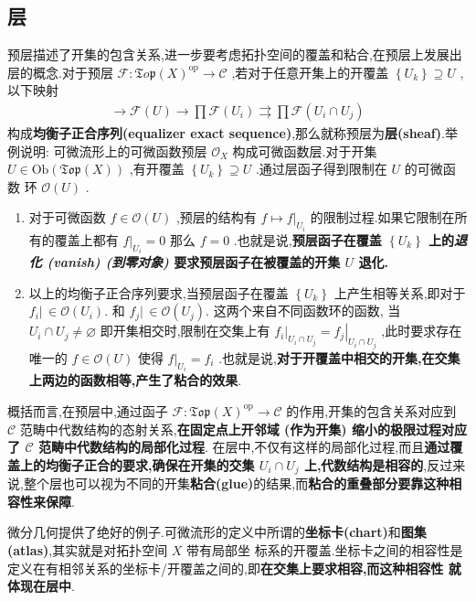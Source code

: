 \subsection{层}
预层描述了开集的包含关系,进一步要考虑拓扑空间的覆盖和粘合,在预层上发展出层的概念.对于预层 $\mathscr{F}: \mathfrak{T} o \mathfrak{p}(X)^{\mathrm{op}} \rightarrow \mathcal{C}$ ,若对于任意开集上的开覆盖 $\left\{U_k\right\} \supseteq U$ ,以下映射
\begin{align*}
\longrightarrow \mathscr{F}(U) \longrightarrow \prod \mathscr{F}\left(U_i\right) \rightrightarrows \prod \mathscr{F}\left(U_i \cap U_j\right)
\end{align*}
构成\textbf{均衡子正合序列(equalizer exact sequence)},那么就称预层为\textbf{层(sheaf)}.举例说明: 可微流形上的可微函数预层 $\mathcal{O}_X$ 构成可微函数层.对于开集 $U \in \mathrm{Ob}(\mathfrak{T o p}(X))$ ,有开覆盖 $\left\{U_k\right\} \supseteq U$ .通过层函子得到限制在 $U$ 的可微函数 环 $\mathcal{O}(U)$ .

\begin{enumerate}
  \item 对于可微函数 $f \in \mathcal{O}(U)$ ,预层的结构有 $\left.f \mapsto f\right|_{U_i}$ 的限制过程.如果它限制在所有的覆盖上都有 $\left.f\right|_{U_i}=0$ 那么 $f=0$ .也就是说,\textbf{预层函子在覆盖 $\left\{U_k\right\}$ 上的\textit{退化 (vanish) (到零对象)} 要求预层函子在被覆盖的开集 $U$ 退化.}

  \item 以上的均衡子正合序列要求,当预层函子在覆盖 $\left\{U_k\right\}$ 上产生相等关系,即对于 $f_i\bigl| \,\in \mathcal{O}\left(U_i\right)\bigr.$ 和 $f_j\bigl|\,\in \mathcal{O}\left(U_j\right)\bigr.$ 这两个来自不同函数环的函数,\textcolor[rgb]{0.66,0.15,0.39}{ 当 $U_i \cap U_j \neq \varnothing$ 即开集相交时,限制在交集上有 $\left.f_i\right|_{U_i \cap U_j}=\left.f_j\right|_{U_i \cap U_j}$ ,此时要求存在唯一的 $f \in \mathcal{O}(U)$ 使得 $\left.f\right|_{U_i}=f_i$ }.也就是说,\textbf{对于开覆盖中相交的开集,在交集上两边的函数相等,产生了粘合的效果}.
\end{enumerate}

\begin{key}
概括而言,在预层中,通过函子 $\mathscr{F}: \mathfrak{T} \mathfrak{o p}(X)^{\mathrm{op}} \rightarrow \mathcal{C}$ 的作用,开集的包含关系对应到 $\mathcal{C}$ 范畴中代数结构的态射关系,\textbf{在固定点上开邻域 (作为开集) 缩小的极限过程对应了 $\mathcal{C}$ 范畴中代数结构的局部化过程}.
在层中,不仅有这样的局部化过程,而且\textbf{通过覆盖上的均衡子正合的要求,确保在开集的交集 $U_i \cap U_j$ 上,代数结构是相容的},反过来说,整个层也可以视为不同的开集\textbf{粘合(glue)}的结果,而\textbf{粘合的重叠部分要靠这种相容性来保障}.
\end{key}
微分几何提供了绝好的例子.可微流形的定义中所谓的\textbf{坐标卡(chart)}和\textbf{图集(atlas)},其实就是对拓扑空间 $X$ 带有局部坐 标系的开覆盖.坐标卡之间的相容性是定义在有相邻关系的坐标卡/开覆盖之间的,即\textbf{在交集上要求相容,而这种相容性 就体现在层中}.

